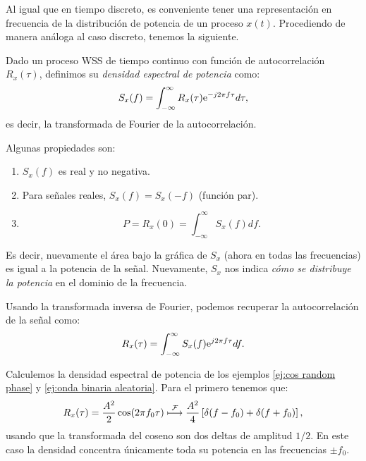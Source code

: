 Al igual que en tiempo discreto, es conveniente tener una representación en frecuencia de la distribución de potencia de un proceso $x(t)$. Procediendo de manera análoga al caso discreto, tenemos la siguiente.
\begin{definicion}\label{def:densidad espectral potencia tc}
    Dado un proceso WSS de tiempo continuo con función de autocorrelación $R_x(\tau)$, definimos su \emph{densidad espectral de potencia} como:
    \begin{equation}\label{eq:dep_tc}
        S_x(f) = \int_{-\infty}^\infty R_x(\tau) \mathrm{e}^{-j2\pi f \tau} d\tau,
    \end{equation}
    es decir, la transformada de Fourier de la autocorrelación.
\end{definicion}

Algunas propiedades son:
\begin{enumerate}
    \item $S_x(f)$ es real y no negativa.
    \item Para señales reales, $S_x(f)=S_x(-f)$ (función par).
    \item \begin{equation*}
    P = R_x(0) = \int_{-\infty}^{\infty} S_x(f) df.
    \end{equation*}
\end{enumerate}
Es decir, nuevamente el área bajo la gráfica de $S_x$ (ahora en todas las frecuencias) es igual a la potencia de la señal. Nuevamente, $S_x$ nos indica \emph{cómo se distribuye la potencia} en el dominio de la frecuencia.

Usando la transformada inversa de Fourier, podemos recuperar la autocorrelación de la señal como:
\begin{equation*}
    R_x(\tau) = \int_{-\infty}^\infty S_x(f) \mathrm{e}^{j2\pi f \tau} df.
\end{equation*}

Calculemos la densidad espectral de potencia de los ejemplos \ref{ej:cos random phase} y \ref{ej:onda binaria aleatoria}. Para el primero tenemos que:
\begin{equation*}
    R_x(\tau) = \frac{A^2}{2} \cos(2\pi f_0 \tau) \;\displaystyle{\mathop{\longmapsto}^{\mathcal{F}}}\; \frac{A^2}{4}\left[\delta(f-f_0) + \delta(f+f_0)\right],
\end{equation*}
usando que la transformada del coseno son dos deltas de amplitud $1/2$. En este caso la densidad concentra únicamente toda su potencia en las frecuencias $\pm f_0$.

